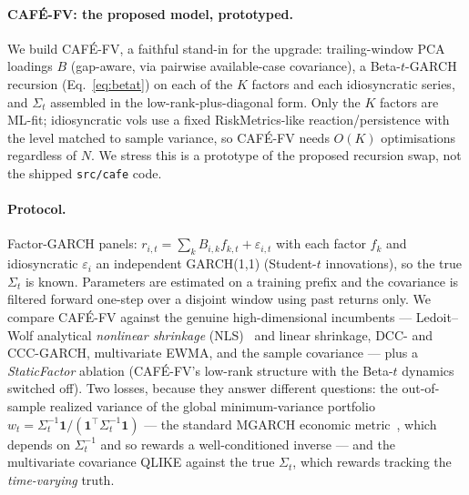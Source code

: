\documentclass[10pt,twocolumn]{article}
\newcommand{\cafe}{CAF\'E}
\newcommand{\fv}{\cafe{}-FV}
\begin{document}
\paragraph{\fv{}: the proposed model, prototyped.} We build \fv{}, a faithful
stand-in for the upgrade: trailing-window PCA loadings $B$ (gap-aware, via pairwise
available-case covariance), a Beta-$t$-GARCH recursion (Eq.~\ref{eq:betat}) on each of
the $K$ factors and each idiosyncratic series, and $\Sigma_t$ assembled in the
low-rank-plus-diagonal form. Only the $K$ factors are ML-fit; idiosyncratic vols use a
fixed RiskMetrics-like reaction/persistence with the level matched to sample variance,
so \fv{} needs $O(K)$ optimisations regardless of $N$. We stress this is a prototype of
the proposed recursion swap, not the shipped \texttt{src/cafe} code.

\paragraph{Protocol.} Factor-GARCH panels: $r_{i,t}=\sum_k B_{i,k}f_{k,t}+
\varepsilon_{i,t}$ with each factor $f_k$ and idiosyncratic $\varepsilon_i$ an
independent GARCH(1,1) (Student-$t$ innovations), so the true $\Sigma_t$ is known.
Parameters are estimated on a training prefix and the covariance is filtered forward
one-step over a disjoint window using past returns only. We compare \fv{} against the
genuine high-dimensional incumbents --- Ledoit--Wolf analytical \emph{nonlinear shrinkage}
(NLS)~\cite{ledoitwolf2020nls} and linear shrinkage, DCC- and CCC-GARCH, multivariate
EWMA, and the sample covariance --- plus a \emph{StaticFactor} ablation (\fv{}'s low-rank
structure with the Beta-$t$ dynamics switched off). Two losses, because they answer
different questions: the out-of-sample realized variance of the global minimum-variance
portfolio $w_t=\Sigma_t^{-1}\mathbf1/(\mathbf1^\top\Sigma_t^{-1}\mathbf1)$ --- the standard
MGARCH economic metric~\cite{engle2002dcc}, which depends on $\Sigma_t^{-1}$ and so rewards
a well-conditioned inverse --- and the multivariate covariance QLIKE against the true
$\Sigma_t$, which rewards tracking the \emph{time-varying} truth.
\end{document}
